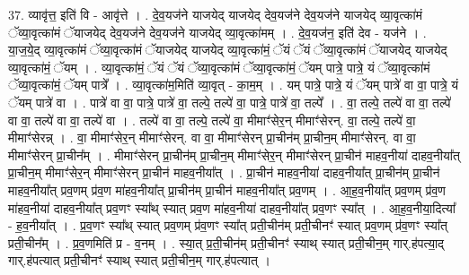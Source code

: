 \documentclass[17pt]{extarticle}
\begin{document}
37. व्यावृ॑त्त॒ इति॑ वि - आवृ॑त्ते । . दे॒व॒यज॑ने याजयेद् याजयेद् देव॒यज॑ने देव॒यज॑ने याजयेद् व्या॒वृत्का॑मं ॅव्या॒वृत्का॑मं ॅयाजयेद् देव॒यज॑ने देव॒यज॑ने याजयेद् व्या॒वृत्का॑मम् । . दे॒व॒यज॑न॒ इति॑ देव - यज॑ने । . या॒ज॒ये॒द् व्या॒वृत्का॑मं ॅव्या॒वृत्का॑मं ॅयाजयेद् याजयेद् व्या॒वृत्का॑मं॒ ॅयं ॅयं ॅव्या॒वृत्का॑मं ॅयाजयेद् याजयेद् व्या॒वृत्का॑मं॒ ॅयम् । . व्या॒वृत्का॑मं॒ ॅयं ॅयं ॅव्या॒वृत्का॑मं ॅव्या॒वृत्का॑मं॒ ॅयम् पात्रे॒ पात्रे॒ यं ॅव्या॒वृत्का॑मं ॅव्या॒वृत्का॑मं॒ ॅयम् पात्रे᳚ । . व्या॒वृत्का॑म॒मिति॑ व्या॒वृत् - का॒म॒म् । . यम् पात्रे॒ पात्रे॒ यं ॅयम् पात्रे॑ वा वा॒ पात्रे॒ यं ॅयम् पात्रे॑ वा । . पात्रे॑ वा वा॒ पात्रे॒ पात्रे॑ वा॒ तल्पे॒ तल्पे॑ वा॒ पात्रे॒ पात्रे॑ वा॒ तल्पे᳚ । . वा॒ तल्पे॒ तल्पे॑ वा वा॒ तल्पे॑ वा वा॒ तल्पे॑ वा वा॒ तल्पे॑ वा । . तल्पे॑ वा वा॒ तल्पे॒ तल्पे॑ वा॒ मीमाꣳ॑सेर॒न् मीमाꣳ॑सेरन्. वा॒ तल्पे॒ तल्पे॑ वा॒ मीमाꣳ॑सेरन्न् । . वा॒ मीमाꣳ॑सेर॒न् मीमाꣳ॑सेरन्. वा वा॒ मीमाꣳ॑सेरन् प्रा॒चीन॑म् प्रा॒चीन॒म् मीमाꣳ॑सेरन्. वा वा॒ मीमाꣳ॑सेरन् प्रा॒चीन᳚म् । . मीमाꣳ॑सेरन् प्रा॒चीन॑म् प्रा॒चीन॒म् मीमाꣳ॑सेर॒न् मीमाꣳ॑सेरन् प्रा॒चीन॑ माहव॒नीया॑ दाहव॒नीया᳚त् प्रा॒चीन॒म् मीमाꣳ॑सेर॒न् मीमाꣳ॑सेरन् प्रा॒चीन॑ माहव॒नीया᳚त् । . प्रा॒चीन॑ माहव॒नीया॑ दाहव॒नीया᳚त् प्रा॒चीन॑म् प्रा॒चीन॑ माहव॒नीया᳚त् प्रव॒णम् प्र॑व॒ण मा॑हव॒नीया᳚त् प्रा॒चीन॑म् प्रा॒चीन॑ माहव॒नीया᳚त् प्रव॒णम् । . आ॒ह॒व॒नीया᳚त् प्रव॒णम् प्र॑व॒ण मा॑हव॒नीया॑ दाहव॒नीया᳚त् प्रव॒णꣳ स्या᳚थ् स्यात् प्रव॒ण मा॑हव॒नीया॑ दाहव॒नीया᳚त् प्रव॒णꣳ स्या᳚त् । . आ॒ह॒व॒नीया॒दित्या᳚ - ह॒व॒नीया᳚त् । . प्र॒व॒णꣳ स्या᳚थ् स्यात् प्रव॒णम् प्र॑व॒णꣳ स्या᳚त् प्रती॒चीन॑म् प्रती॒चीनꣳ॑ स्यात् प्रव॒णम् प्र॑व॒णꣳ स्या᳚त् प्रती॒चीन᳚म् । . प्र॒व॒णमिति॑ प्र - व॒नम् । . स्या॒त् प्र॒ती॒चीन॑म् प्रती॒चीनꣳ॑ स्याथ् स्यात् प्रती॒चीन॒म् गार्.ह॑पत्या॒द् गार्.ह॑पत्यात् प्रती॒चीनꣳ॑ स्याथ् स्यात् प्रती॒चीन॒म् गार्.ह॑पत्यात् । \newline
\end{document}
